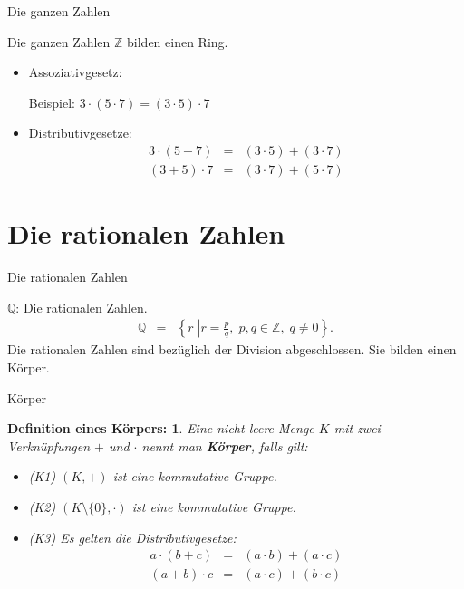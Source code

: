 \documentclass[german]{beamer}
\newcommand{\bq}{\begin{eqnarray*}}
\newcommand{\eq}{\end{eqnarray*}}
\newtheorem*{mytheorem4}{{\bf Definition eines K\"orpers}:}
\begin{document}
\begin{frame}{Die ganzen Zahlen}

Die ganzen Zahlen ${\mathbb Z}$ bilden einen Ring.

\begin{itemize}
\item Assoziativgesetz: 

Beispiel: $3 \cdot ( 5 \cdot 7 ) = ( 3 \cdot 5 ) \cdot 7$
\item Distributivgesetze:
\bq
3 \cdot (5+ 7) &=  & (3 \cdot 5) + (3 \cdot 7) 
 \nonumber \\
(3 + 5) \cdot 7 & = & (3 \cdot 7) + (5 \cdot 7)
\eq
\end{itemize}
\end{frame}


\section{Die rationalen Zahlen}

\frame{\sectionpage}

\begin{frame}{Die rationalen Zahlen}

\alert{${\mathbb Q}$}: Die rationalen Zahlen.
\bq
 {\mathbb Q } & = & \left\{ r \; \left| r = \frac{p}{q}, \right. \; p,q \in {\mathbb Z}, \; q \neq 0 \right\}.
\eq
Die rationalen Zahlen sind bez\"uglich der Division abgeschlossen.
Sie bilden einen K\"orper.

\end{frame}

\begin{frame}{K\"orper}

\begin{mytheorem4}
Eine nicht-leere Menge $K$ mit zwei Verkn\"upfungen $+$ und $\cdot$ nennt man {\bf K\"orper},
falls gilt:
\begin{itemize}
\item (K1) $(K,+)$ ist eine kommutative Gruppe.
\item (K2) $(K\setminus\{0\}, \cdot)$ ist eine kommutative Gruppe.
\item (K3) Es gelten die Distributivgesetze:
\bq
a \cdot ( b+ c ) &=  & (a \cdot b ) + ( a \cdot c ) \\
(a + b ) \cdot c & = & (a \cdot c) + ( b \cdot c)
\eq
\end{itemize}
\end{mytheorem4}

\end{frame}
\end{document}
